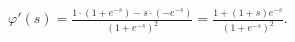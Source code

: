 \newcommand{\w}{\mathbf{w}}
\newcommand{\x}{\mathbf{x}}
\newcommand{\y}{\mathbf{y}}
\newcommand{\err}{\mathrm{err}}
\newcommand{\Ein}{\mathrm{E_{in}}}

\begin{pr}
$\varphi'(s)=\frac{1\cdot(1+e^{-s})-s\cdot(-e^{-s})}{(1+e^{-s})^2}=\frac{1+(1+s)e^{-s}}{(1+e^{-s})^2}$.
\end{pr}
